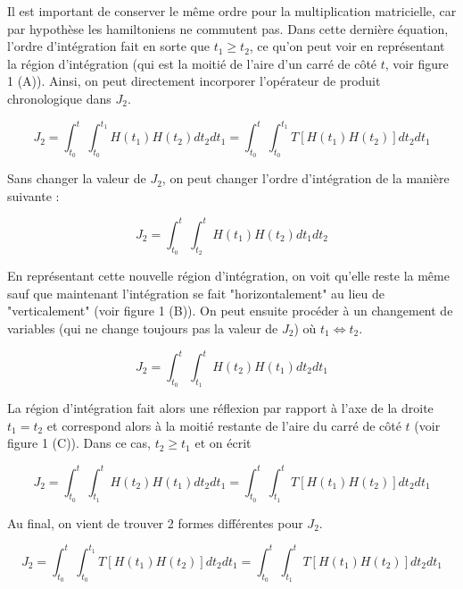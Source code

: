 Il est important de conserver le même ordre pour la multiplication matricielle, car par hypothèse les hamiltoniens ne commutent pas. Dans cette dernière équation, l'ordre d'intégration fait en sorte que $t_1 \geq t_2$, ce qu'on peut voir en représentant la région d'intégration (qui est la moitié de l'aire d'un carré de côté $t$, voir figure 1 (A)). Ainsi, on peut directement incorporer l'opérateur de produit chronologique dans $J_2$.

\begin{equation*}
    J_2 = \int_{t_0}^{t}\int_{t_0}^{t_1}H(t_1)H(t_2)dt_2dt_1  = \int_{t_0}^{t}\int_{t_0}^{t_1}T\left[H(t_1)H(t_2)\right]dt_2dt_1
\end{equation*}

Sans changer la valeur de $J_2$, on peut changer l'ordre d'intégration de la manière suivante :

\begin{equation*}
    J_2 = \int_{t_0}^{t}\int_{t_2}^{t}H(t_1)H(t_2)dt_1dt_2
\end{equation*}

En représentant cette nouvelle région d'intégration, on voit qu'elle reste la même sauf que maintenant l'intégration se fait "horizontalement" au lieu de "verticalement" (voir figure 1 (B)). On peut ensuite procéder à un changement de variables (qui ne change toujours pas la valeur de $J_2$) où $t_1 \Leftrightarrow t_2$. 

\begin{equation*}
    J_2 = \int_{t_0}^{t}\int_{t_1}^{t}H(t_2)H(t_1)dt_2dt_1
\end{equation*}

La région d'intégration fait alors une réflexion par rapport à l'axe de la droite $t_1=t_2$ et correspond alors à la moitié restante de l'aire du carré de côté $t$ (voir figure 1 (C)). Dans ce cas, $t_2 \geq t_1$ et on écrit 

\begin{equation*}
    J_2 = \int_{t_0}^{t}\int_{t_1}^{t}H(t_2)H(t_1)dt_2dt_1 = \int_{t_0}^{t}\int_{t_1}^{t}T\left[H(t_1)H(t_2)\right]dt_2dt_1
\end{equation*}

Au final, on vient de trouver 2 formes différentes pour $J_2$.

\begin{equation}
    J_2 = \int_{t_0}^{t}\int_{t_0}^{t_1}T\left[H(t_1)H(t_2)\right]dt_2dt_1 = \int_{t_0}^{t}\int_{t_1}^{t}T\left[H(t_1)H(t_2)\right]dt_2dt_1
\end{equation}

